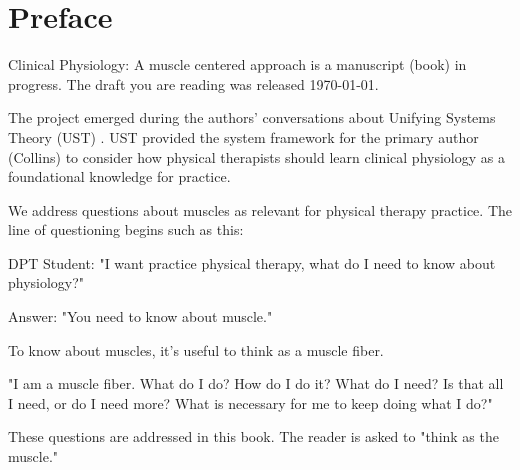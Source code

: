 \chapter*{Preface}

Clinical Physiology: A muscle centered approach is a manuscript (book) in progress. The draft you are reading was released \today.

The project emerged during the authors' conversations about Unifying Systems Theory (UST) \cite{kahlen_perception_2017}. UST provided the system framework for the primary author (Collins) to consider how physical therapists should learn clinical physiology as a foundational knowledge for practice. 

We address questions about muscles as relevant for physical therapy practice. The line of questioning begins such as this: 

\vspace{5mm}

\noindent DPT Student: "I want practice physical therapy, what do I need to know about physiology?" 

\vspace{5mm}

\noindent Answer: "You need to know about muscle." 

\vspace{5mm}

\noindent To know about muscles, it's useful to think as a muscle fiber. 
\vspace{5mm}

\noindent "I am a muscle fiber. What do I do? How do I do it? What do I need? Is that all I need, or do I need more? What is necessary for me to keep doing what I do?"

\vspace{5mm}

\noindent These questions are addressed in this book. The reader is asked to "think as the muscle."

